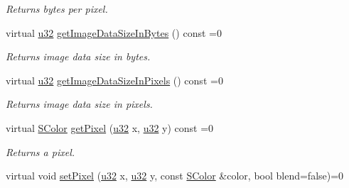 \begin{DoxyCompactItemize}
\begin{DoxyCompactList}\small\item\em Returns bytes per pixel. \end{DoxyCompactList}\item 
\mbox{\label{classirr_1_1video_1_1IImage_aaec5039f63d29633a07f0717baeb409b}} 
virtual \hyperlink{namespaceirr_a0416a53257075833e7002efd0a18e804}{u32} \hyperlink{classirr_1_1video_1_1IImage_aaec5039f63d29633a07f0717baeb409b}{get\+Image\+Data\+Size\+In\+Bytes} () const =0
\begin{DoxyCompactList}\small\item\em Returns image data size in bytes. \end{DoxyCompactList}\item 
\mbox{\label{classirr_1_1video_1_1IImage_a9134a214b0919ba875a130e43dbc92f1}} 
virtual \hyperlink{namespaceirr_a0416a53257075833e7002efd0a18e804}{u32} \hyperlink{classirr_1_1video_1_1IImage_a9134a214b0919ba875a130e43dbc92f1}{get\+Image\+Data\+Size\+In\+Pixels} () const =0
\begin{DoxyCompactList}\small\item\em Returns image data size in pixels. \end{DoxyCompactList}\item 
\mbox{\label{classirr_1_1video_1_1IImage_a0645adce59442e67261eca084565a9df}} 
virtual \hyperlink{classirr_1_1video_1_1SColor}{S\+Color} \hyperlink{classirr_1_1video_1_1IImage_a0645adce59442e67261eca084565a9df}{get\+Pixel} (\hyperlink{namespaceirr_a0416a53257075833e7002efd0a18e804}{u32} x, \hyperlink{namespaceirr_a0416a53257075833e7002efd0a18e804}{u32} y) const =0
\begin{DoxyCompactList}\small\item\em Returns a pixel. \end{DoxyCompactList}\item 
\mbox{\label{classirr_1_1video_1_1IImage_a89bf6020ce6ac1066e4d585ce46f79bd}} 
virtual void \hyperlink{classirr_1_1video_1_1IImage_a89bf6020ce6ac1066e4d585ce46f79bd}{set\+Pixel} (\hyperlink{namespaceirr_a0416a53257075833e7002efd0a18e804}{u32} x, \hyperlink{namespaceirr_a0416a53257075833e7002efd0a18e804}{u32} y, const \hyperlink{classirr_1_1video_1_1SColor}{S\+Color} \&color, bool blend=false)=0

\end{DoxyCompactItemize}
